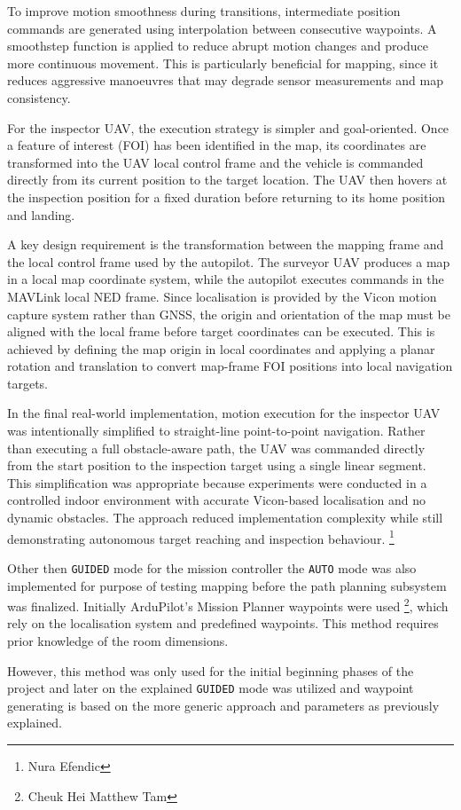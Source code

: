 To improve motion smoothness during transitions, intermediate position commands are generated using interpolation between consecutive waypoints. A smoothstep function is applied to reduce abrupt motion changes and produce more continuous movement. This is particularly beneficial for mapping, since it reduces aggressive manoeuvres that may degrade sensor measurements and map consistency.

For the inspector UAV, the execution strategy is simpler and goal-oriented. Once a feature of interest (FOI) has been identified in the map, its coordinates are transformed into the UAV local control frame and the vehicle is commanded directly from its current position to the target location. The UAV then hovers at the inspection position for a fixed duration before returning to its home position and landing.

A key design requirement is the transformation between the mapping frame and the local control frame used by the autopilot. The surveyor UAV produces a map in a local map coordinate system, while the autopilot executes commands in the MAVLink local NED frame. Since localisation is provided by the Vicon motion capture system rather than GNSS, the origin and orientation of the map must be aligned with the local frame before target coordinates can be executed. This is achieved by defining the map origin in local coordinates and applying a planar rotation and translation to convert map-frame FOI positions into local navigation targets.

In the final real-world implementation, motion execution for the inspector UAV was intentionally simplified to straight-line point-to-point navigation. Rather than executing a full obstacle-aware path, the UAV was commanded directly from the start position to the inspection target using a single linear segment. This simplification was appropriate because experiments were conducted in a controlled indoor environment with accurate Vicon-based localisation and no dynamic obstacles. The approach reduced implementation complexity while still demonstrating autonomous target reaching and inspection behaviour. \footnote{Nura Efendic}

Other then \texttt{GUIDED} mode for the mission controller the \texttt{AUTO} mode was also implemented for purpose of testing mapping before the path planning subsystem was finalized. Initially ArduPilot's Mission Planner waypoints were used \footnote{Cheuk Hei Matthew Tam}, which rely on the localisation system and predefined waypoints. This method requires prior knowledge of the room dimensions. 

However, this method was only used for the initial beginning phases of the project and later on the explained \texttt{GUIDED} mode was utilized and waypoint generating is based on the more generic approach and parameters as previously explained.